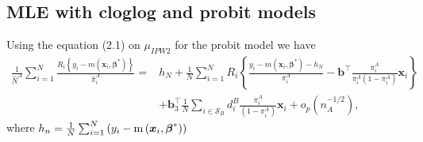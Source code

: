 \documentclass[
  letterpaper,
  DIV=11,
  numbers=noendperiod]{scrreprt}
\begin{document}
\subsection{MLE with cloglog and probit
models}\label{mle-with-cloglog-and-probit-models}

Using the equation (2.1) on \(\mu_{IPW2}\) for the probit model we have
\[
\begin{equation}
\begin{aligned}
\frac{1}{\hat{N}^A} \sum_{i=1}^N \frac{R_i\left\{y_i-m\left(\boldsymbol{x}_i, \boldsymbol{\beta}^*\right)\right\}}{\hat{\pi}_i^A} = & h_N+\frac{1}{N} \sum_{i=1}^N R_i\left\{\frac{y_i-m\left(\boldsymbol{x}_i, \boldsymbol{\beta}^*\right)-h_N}{\pi_i^A}-\mathbf{b}^{\top} \frac{\dot{\pi}_i^A}{\pi_i^A \left(1 - \pi_i^A\right)} \boldsymbol{x}_i\right\} \\
& +\mathbf{b}_3^{\top} \frac{1}{N} \sum_{i \in \mathcal{S}_B} d_i^B \frac{\dot{\pi}_i^A}{\left(1 - \pi_i^A\right)} \boldsymbol{x}_i+o_p\left(n_A^{-1 / 2}\right),
\end{aligned}
\end{equation}
\] where
\(h_n = \frac{1}{N} \sum_{i=1}^N \left(y_i - \operatorname{m}\left(\boldsymbol{x}_i,\boldsymbol{\beta}^*\right)\right)\)
\end{document}
